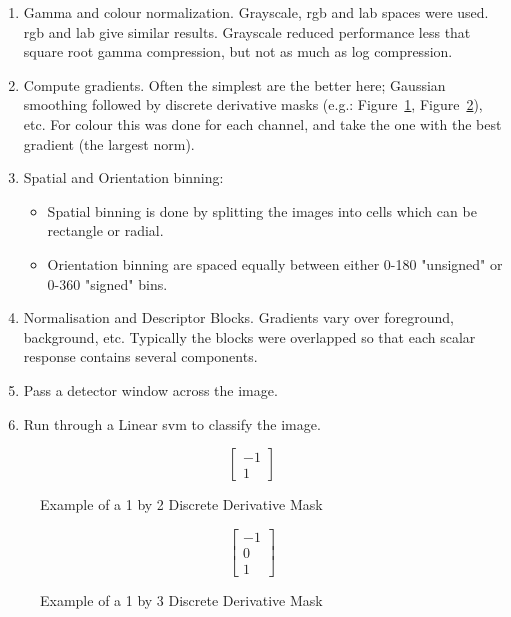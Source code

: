 \begin{enumerate}
\item Gamma and colour normalization. Grayscale, \gls{rgb} and \gls{lab} spaces were used.
\gls{rgb} and \gls{lab} give similar results. Grayscale reduced performance less that square root 
gamma compression, but not as much as log compression.

\item Compute gradients. Often the simplest are the better here; Gaussian smoothing followed by 
discrete derivative masks (e.g.: Figure~\ref{fig:1x2-ddm}, Figure~\ref{fig:1x3-ddm}), etc. For 
colour this was done for each channel, and take the one with the best gradient (the largest norm).

\item Spatial and Orientation binning:
\begin{itemize}
\item Spatial binning is done by splitting the images into cells which can be rectangle or radial.
\item Orientation binning are spaced equally between either 0-180 "unsigned" or 0-360 "signed" 
bins.
\end{itemize}

\item Normalisation and Descriptor Blocks. Gradients vary over foreground, background, etc. 
Typically the blocks were overlapped so that each scalar response contains several components.

\item Pass a detector window across the image.

\item Run through a Linear \gls{svm} to classify the image.
\end{enumerate}

\begin{figure}[h]
$$
\begin{bmatrix}
-1 \\
1
\end{bmatrix}
$$
\caption{Example of a 1 by 2 Discrete Derivative Mask} \label{fig:1x2-ddm}
\end{figure}

\begin{figure}[h]
$$
\begin{bmatrix}
-1 \\
0 \\
1
\end{bmatrix}
$$
\caption{Example of a 1 by 3 Discrete Derivative Mask} \label{fig:1x3-ddm}
\end{figure}

